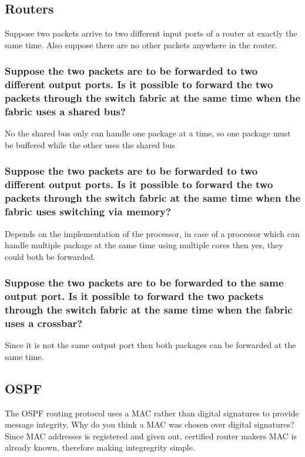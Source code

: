 \documentclass[12pt, a4paper]{article}
\begin{document}
		\subsection{Routers}
			Suppose two packets arrive to two different input ports of a router at exactly the same time. Also suppose there are no other packets anywhere in the router.
			\subsubsection{Suppose the two packets are to be forwarded to two different output ports. Is it possible to forward the two packets through the switch fabric at the same time when the fabric uses a shared bus?}
				No the shared bus only can handle one package at a time, so one package must be buffered while the other uses the shared bus
			\subsubsection{Suppose the two packets are to be forwarded to two different output ports. Is it possible to forward the two packets through the switch fabric at the same time when the fabric uses switching via memory?}
				Depends on the implementation of the processor, in case of a processor which can handle multiple package at the same time using multiple cores then yes, they could both be forwarded.
			\subsubsection{ Suppose the two packets are to be forwarded to the same output port. Is it possible to forward the two packets through the switch fabric at the same time when the fabric uses a crossbar?}
				Since it is not the same output port then both packages can be forwarded at the same time.
		\subsection{OSPF}
			The OSPF routing protocol uses a MAC rather than digital signatures to provide message integrity. Why do you think a MAC was chosen over digital signatures?\\
			Since MAC addresses is registered and given out, certified router makers MAC is already known, therefore making integregrity simple.
\end{document}
